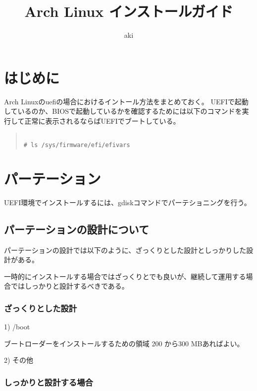\documentclass[dvipdfmx]{jsarticle}
\begin{document}
\title{Arch Linux インストールガイド}
\author{aki}
\maketitle

\section{はじめに}

Arch Linuxのuefiの場合におけるイントール方法をまとめておく。
UEFIで起動しているのか、BIOSで起動しているかを確認するためには以下のコマンドを実行して正常に表示されるならばUEFIでブートしている。

\begin{quote}
\begin{verbatim}

# ls /sys/firmware/efi/efivars

\end{verbatim}
\end{quote}

\section{パーテーション}

UEFI環境でインストールするには、gdiskコマンドでパーテショニングを行う。

\subsection{パーテーションの設計について}


パーテーションの設計では以下のように、ざっくりとした設計としっかりした設計がある。

一時的にインストールする場合ではざっくりとでも良いが、継続して運用する場合ではしっかりと設計するべきである。

\subsubsection{ざっくりとした設計}

1) /boot 

ブートローダーをインストールするための領域 200 から300 MBあればよい。

2) その他 

\subsubsection{しっかりと設計する場合}
\end{document}
